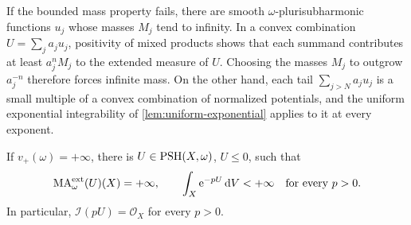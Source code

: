 If the bounded mass property fails, there are smooth $\omega$-plurisubharmonic functions $u_j$ whose masses $M_j$ tend to infinity. In a convex combination $U=\sum_ja_ju_j$, positivity of mixed products shows that each summand contributes at least $a_j^nM_j$ to the extended measure of $U$. Choosing the masses $M_j$ to outgrow $a_j^{-n}$ therefore forces infinite mass. On the other hand, each tail $\sum_{j>N}a_ju_j$ is a small multiple of a convex combination of normalized potentials, and the uniform exponential integrability of \cref{lem:uniform-exponential} applies to it at every exponent.

\begin{theorem}\label{thm:infinite-mass-witness}
If $v_+(\omega)=+\infty$, there is $U\in\mathrm{PSH}(X,\omega)$, $U\leq0$, such that
\[
 \mathrm{MA}^{\mathrm{ext}}_\omega(U)(X)=+\infty,
 \qquad
 \int_X\mathrm{e}^{-pU}\,\mathrm{d}V<+\infty\quad\hbox{for every }p>0.
\]
In particular, $\mathcal I(pU)=\mathcal O_X$ for every $p>0$.
\end{theorem}
